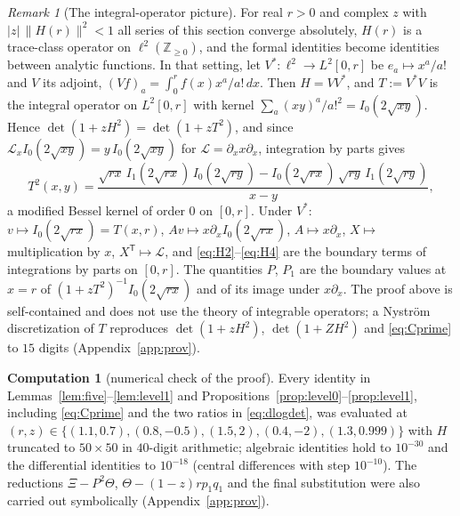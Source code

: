 \documentclass[11pt]{article}
\theoremstyle{definition}
\newtheorem{computation}[theorem]{Computation}
\theoremstyle{remark}
\newtheorem{remark}[theorem]{Remark}
\newcommand{\Z}{\mathbb{Z}}
\begin{document}
\begin{remark}[The integral-operator picture]\label{rem:Tpicture}
For real $r>0$ and complex $z$ with $|z|\,\|H(r)\|^2<1$ all series of this section converge absolutely, $H(r)$ is a trace-class operator on $\ell^2(\Z_{\ge0})$, and the formal identities become identities between analytic functions. In that setting, let $V^*:\ell^2\to L^2[0,r]$ be $e_a\mapsto x^a/a!$ and $V$ its adjoint, $(Vf)_a=\int_0^rf(x)x^a/a!\,dx$. Then $H=VV^*$, and $T:=V^*V$ is the integral operator on $L^2[0,r]$ with kernel $\sum_a(xy)^a/a!^2=I_0(2\sqrt{xy})$. Hence $\det(1+zH^2)=\det(1+zT^2)$, and since $\mathcal L_xI_0(2\sqrt{xy})=y\,I_0(2\sqrt{xy})$ for $\mathcal L=\partial_xx\partial_x$, integration by parts gives
\[
T^2(x,y)=\frac{\sqrt{rx}\,I_1(2\sqrt{rx})\,I_0(2\sqrt{ry})-I_0(2\sqrt{rx})\,\sqrt{ry}\,I_1(2\sqrt{ry})}{x-y},
\]
a modified Bessel kernel of order $0$ on $[0,r]$. Under $V^*$: $v\mapsto I_0(2\sqrt{rx})=T(x,r)$, $Av\mapsto x\partial_xI_0(2\sqrt{rx})$, $A\mapsto x\partial_x$, $X\mapsto$ multiplication by $x$, $X^{\mathsf T}\mapsto\mathcal L$, and \eqref{eq:H2}--\eqref{eq:H4} are the boundary terms of integrations by parts on $[0,r]$. The quantities $P$, $P_1$ are the boundary values at $x=r$ of $(1+zT^2)^{-1}I_0(2\sqrt{rx})$ and of its image under $x\partial_x$. The proof above is self-contained and does not use the theory of integrable operators; a Nystr\"om discretization of $T$ reproduces $\det(1+zH^2)$, $\det(1+ZH^2)$ and \eqref{eq:Cprime} to $15$ digits (Appendix~\ref{app:prov}).
\end{remark}

\begin{computation}[numerical check of the proof]\label{comp:proofcheck}
Every identity in Lemmas~\ref{lem:five}--\ref{lem:level1} and Propositions~\ref{prop:level0}--\ref{prop:level1}, including \eqref{eq:Cprime} and the two ratios in \eqref{eq:dlogdet}, was evaluated at $(r,z)\in\{(1.1,0.7),(0.8,-0.5),(1.5,2),(0.4,-2),(1.3,0.999)\}$ with $H$ truncated to $50\times50$ in $40$-digit arithmetic; algebraic identities hold to $10^{-30}$ and the differential identities to $10^{-18}$ (central differences with step $10^{-10}$). The reductions $\Xi-P^2\Theta$, $\Theta-(1-z)rp_1q_1$ and the final substitution were also carried out symbolically (Appendix~\ref{app:prov}).
\end{computation}
\end{document}
